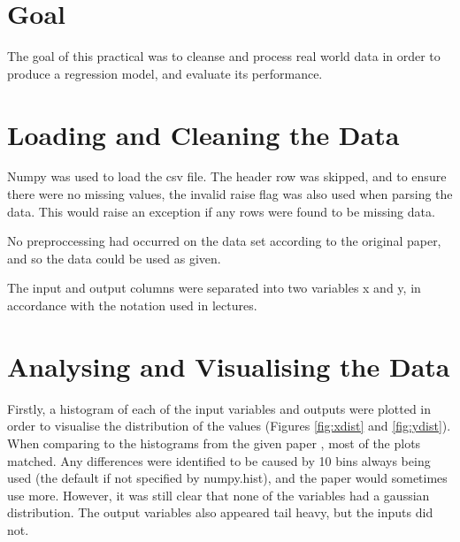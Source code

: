 \documentclass[12pt]{article}
\begin{document}

\part*{Goal}

The goal of this practical was to cleanse and process real world data in order to produce a regression model, and evaluate its performance.

\tableofcontents

\pagebreak

\setcounter{page}{1}

\part{Loading and Cleaning the Data}

Numpy was used to load the csv file. The header row was skipped, and to ensure there were no missing values, the invalid raise flag was also used when parsing the data. This would raise an exception if any rows were found to be missing data. 

No preproccessing had occurred on the data set according to the original paper, and so the data could be used as given.

The input and output columns were separated into two variables x and y, in accordance with the notation used in lectures.

\part{Analysing and Visualising the Data}

Firstly, a histogram of each of the input variables and outputs were plotted in order to visualise the distribution of the values (Figures \ref{fig:xdist} and \ref{fig:ydist}). When comparing to the histograms from the given paper \cite{tsanas_xifara_2012}, most of the plots matched. Any differences were identified to be caused by 10 bins always being used (the default if not specified by numpy.hist), and the paper would sometimes use more. However, it was still clear that none of the variables had a gaussian distribution. The output variables also appeared tail heavy, but the inputs did not.
\end{document}
